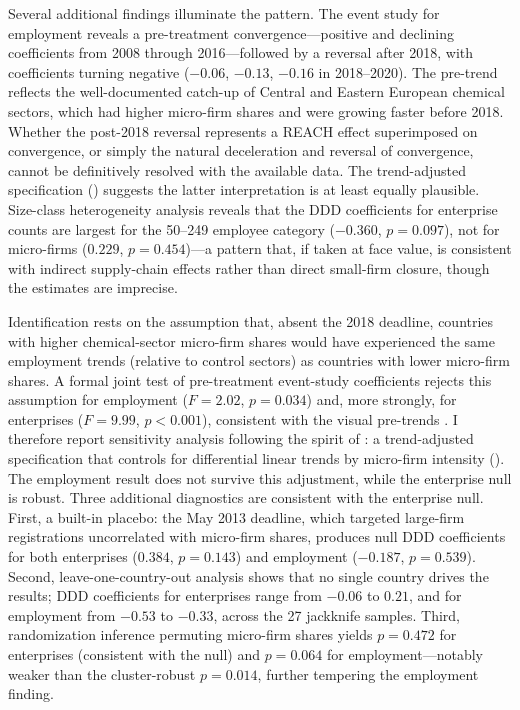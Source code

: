 \documentclass[12pt]{article}
\begin{document}
Several additional findings illuminate the pattern. The event study for employment reveals a pre-treatment convergence---positive and declining coefficients from 2008 through 2016---followed by a reversal after 2018, with coefficients turning negative ($-0.06$, $-0.13$, $-0.16$ in 2018--2020). The pre-trend reflects the well-documented catch-up of Central and Eastern European chemical sectors, which had higher micro-firm shares and were growing faster before 2018. Whether the post-2018 reversal represents a REACH effect superimposed on convergence, or simply the natural deceleration and reversal of convergence, cannot be definitively resolved with the available data. The trend-adjusted specification () suggests the latter interpretation is at least equally plausible. Size-class heterogeneity analysis reveals that the DDD coefficients for enterprise counts are largest for the 50--249 employee category ($-0.360$, $p = 0.097$), not for micro-firms ($0.229$, $p = 0.454$)---a pattern that, if taken at face value, is consistent with indirect supply-chain effects rather than direct small-firm closure, though the estimates are imprecise.

Identification rests on the assumption that, absent the 2018 deadline, countries with higher chemical-sector micro-firm shares would have experienced the same employment trends (relative to control sectors) as countries with lower micro-firm shares. A formal joint test of pre-treatment event-study coefficients rejects this assumption for employment ($F = 2.02$, $p = 0.034$) and, more strongly, for enterprises ($F = 9.99$, $p < 0.001$), consistent with the visual pre-trends \citep{roth2022pretest}. I therefore report sensitivity analysis following the spirit of \citet{rambachan2023}: a trend-adjusted specification that controls for differential linear trends by micro-firm intensity (). The employment result does not survive this adjustment, while the enterprise null is robust. Three additional diagnostics are consistent with the enterprise null. First, a built-in placebo: the May 2013 deadline, which targeted large-firm registrations uncorrelated with micro-firm shares, produces null DDD coefficients for both enterprises ($0.384$, $p = 0.143$) and employment ($-0.187$, $p = 0.539$). Second, leave-one-country-out analysis shows that no single country drives the results; DDD coefficients for enterprises range from $-0.06$ to $0.21$, and for employment from $-0.53$ to $-0.33$, across the 27 jackknife samples. Third, randomization inference permuting micro-firm shares yields $p = 0.472$ for enterprises (consistent with the null) and $p = 0.064$ for employment---notably weaker than the cluster-robust $p = 0.014$, further tempering the employment finding.
\end{document}
